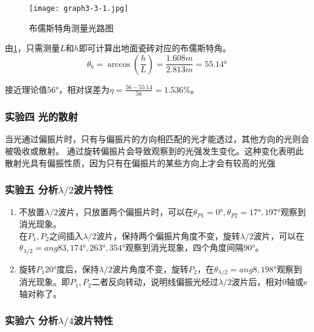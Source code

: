 \documentclass[dvipsnames, svgnames,a4paper,11pt]{article}
\begin{document}
	\begin{figure}[htbp]
		\centering
		\texttt{[image: graph3-3-1.jpg]}
		\caption{布儒斯特角测量光路图}
		\label{fig:graph3-3-1}
	\end{figure}

	由\cref{fig:graph3-3-1}，只需测量$L$和$h$即可计算出地面瓷砖对应的布儒斯特角。
	\[
	\theta_b=\arccos(\frac{h}{L})=\frac{1.608m}{2.813m}=\ang{55.14}	
	\]
	
	接近理论值$\ang{56}$，相对误差为$\eta=\frac{56-55.14}{56}=1.536\%$。



	\subsubsection{实验四 \quad 光的散射}

	当光通过偏振片时，只有与偏振片的方向相匹配的光才能透过，其他方向的光则会被吸收或散射。
	通过旋转偏振片会导致观察到的光强发生变化。这种变化表明此散射光具有偏振性质，因为只有在偏振片的某些方向上才会有较高的光强





	\subsubsection{实验五 \quad 分析$\lambda/2$波片特性}

	\begin{enumerate}
		\item 不放置$\lambda/2$波片，只放置两个偏振片时，可以在$\theta_{P1}=\ang{0},\theta_{P2}=\ang{17},\ang{197}$观察到消光现象。	\\
			在$P_1,P_2$之间插入$\lambda/2$波片，保持两个偏振片角度不变，旋转$\lambda/2$波片，可以在$\theta_{\lambda/2}=ang{83},\ang{174},\ang{263},\ang{354}$观察到消光现象，四个角度间隔$\ang{90}$。
		\item 旋转$P_1\ang{20}$度后，保持$\lambda/2$波片角度不变，旋转$P_2$，在$\theta_{\lambda/2}=ang{8},\ang{198}$观察到消光现象。即$P_1,P_2$二者反向转动，说明线偏振光经过$\lambda/2$波片后，相对0轴或e轴对称了。
	\end{enumerate}
	







	\subsubsection{实验六 \quad 分析$\lambda/4$波片特性}
\end{document}

